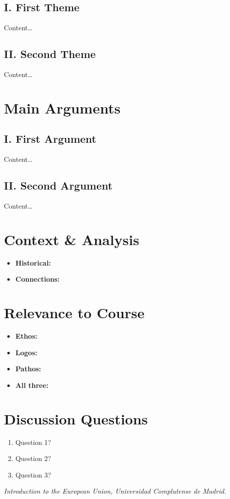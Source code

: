 \documentclass[11pt,a4paper]{article}
\begin{document}
\subsection*{I. First Theme}
Content\ldots

\subsection*{II. Second Theme}
Content\ldots

\section*{Main Arguments}

\subsection*{I. First Argument}
Content\ldots

\subsection*{II. Second Argument}
Content\ldots

\section*{Context \& Analysis}

\begin{itemize}
\item \textbf{Historical:}
\item \textbf{Connections:}
\end{itemize}

\section*{Relevance to Course}

\begin{itemize}
\item \textbf{Ethos:}
\item \textbf{Logos:}
\item \textbf{Pathos:}
\item \textbf{All three:}
\end{itemize}

\section*{Discussion Questions}

\begin{enumerate}
\item Question 1?
\item Question 2?
\item Question 3?
\end{enumerate}

\vspace{1em}
\noindent\footnotesize\textit{Introduction to the European Union, Universidad Complutense de Madrid.}
\end{document}
